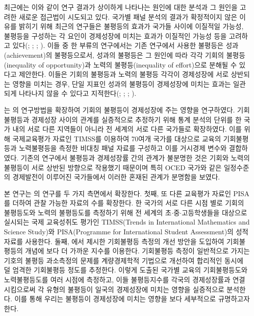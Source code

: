 최근에는 이와 같이 연구 결과가 상이하게 나타나는 원인에 대한 분석과 그 원인을 고려한 새로운 접근법이 시도되고 있다. 국가별 패널 분석의 결과가 확정적이지 않은 이유를 밝히기 위해 최근의 연구들은 불평등의 효과가 국가들 사이에 이질적일 가능성, 불평등을 구성하는 각 요인이 경제성장에 미치는 효과가 이질적인 가능성 등을 고려하고 있다(\citet{voit05, voit11}; \citet{cc10}; \citet{hetl14}; \citet{mnr13,mnr14}). 이들 중 한 부류의 연구에서는 기존 연구에서 사용한 불평등은 성과(achievement)의 불평등으로서, 성과의 불평등은 그 원인에 따라 각각 기회의 불평등(inequality of opportunity)과 노력의 불평등(inequality of effort)으로 분해될 수 있다고 제안한다. 이들은 기회의 불평등과 노력의 불평등 각각이 경제성장에 서로 상반되는 영향을 미치는 경우, 단일 지표인 성과의 불평등이 경제성장에 미치는 효과는 일관되게 나타나지 않을 수 있다고 지적한다(\citet{mnr13, mnr14}; \citet{metl13}; \citet{fetl18}; \citet{ane20} ).

\citet{kno17}는 \citet{mnr13}의 연구방법을 확장하여 기회의 불평등이 경제성장에 주는 영향을 연구하였다. 기회불평등과 경제성장 사이의 관계를 실증적으로 추정하기 위해 통계 분석의 단위를 한 국가 내의 서로 다른 지역들이 아니라 전 세계의 서로 다른 국가들로 확장하였다. 이를 위해 국제교육평가 자료인 TIMSS를 이용하여 70여개 국가를 대상으로 교육의 기회불평등과 노력불평등을 측정한 비대칭 패널 자료를 구성하고 이를 거시경제 변수와 결합하였다. 기존의 연구에서 불평등과 경제성장률 간의 관계가 불분명한 것은 기회와 노력의 불평등이 서로 상반된 방향으로 작용했기 때문이며 특히 OCED 국가와 같은 일정수준의 경제발전이 이루어진 국가들에서 이러한 혼재된 관계가 분명함을 보였다.

본 연구는 \citet{kno17}의 연구를 두 가지 측면에서 확장한다. 첫째, 또 다른 교육평가 자료인 PISA를 더하여 관찰 가능한 자료의 수를 확장한다. 한 국가의 서로 다른 시점 별로 기회의 불평등도와 노력의 불평등도를 측정하기 위해 전 세계의 초$\cdot$중$\cdot$고등학생들을 대상으로 실시되는 국제 교육성취도 평가인 TIMSS(Trends in International Mathematics and Science Study)와 PISA(Programme for International Student Assessment)의 성적 자료를 사용한다. 둘째, \citet{betl12}에서 제시한 기회불평등 측정의 개선 방안을 도입하여 기회불평등의 개념에 보다 더 가까운 지수를 이용한다. 기회불평등 측정이 일반적으로 가지는 기호의 불평등 과소측정의 문제를 계량경제학적 기법으로 개선하여 합리적인 동시에 덜 엄격한 기회불평등 정도를 추정한다.   이렇게 도출된 국가별 교육의 기회불평등도와 노력불평등도를 여러 시점에 측정하고, 이들 불평등지수를 각국의 경제성장률과 연결시킴으로써 각 유형의 불평등이 일국의 경제성장에 미치는 영향을 실증적으로 분석한다. 이를 통해 우리는 불평등이 경제성장에 미치는 영향을 보다 세부적으로 규명하고자 한다.

